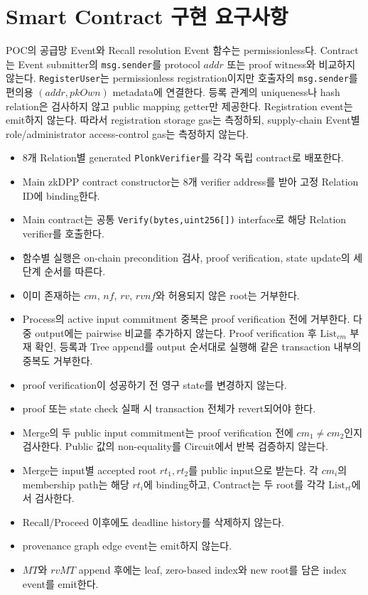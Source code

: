 \documentclass[11pt,a4paper]{extarticle}
\newcommand{\List}[1]{\mathrm{List}_{#1}}
\begin{document}
\section{Smart Contract 구현 요구사항}

POC의 공급망 Event와 Recall resolution Event 함수는 permissionless다. Contract는
Event submitter의 \texttt{msg.sender}를 protocol $addr$ 또는 proof witness와 비교하지
않는다. \texttt{RegisterUser}는 permissionless registration이지만 호출자의
\texttt{msg.sender}를 편의용 $(addr,pkOwn)$ metadata에 연결한다. 등록 관계의
uniqueness나 hash relation은 검사하지 않고 public mapping getter만 제공한다.
Registration event는 emit하지 않는다. 따라서 registration storage gas는
측정하되, supply-chain Event별 role/administrator access-control gas는 측정하지 않는다.

\begin{itemize}
  \item 8개 Relation별 generated \texttt{PlonkVerifier}를 각각 독립 contract로 배포한다.
  \item Main zkDPP contract constructor는 8개 verifier address를 받아 고정 Relation ID에 binding한다.
  \item Main contract는 공통 \texttt{Verify(bytes,uint256[])} interface로 해당 Relation verifier를 호출한다.
  \item 함수별 실행은 on-chain precondition 검사, proof verification, state update의
        세 단계 순서를 따른다.
  \item 이미 존재하는 $cm$, $nf$, $rv$, $rvnf$와 허용되지 않은 root는 거부한다.
  \item Process의 active input commitment 중복은 proof verification 전에 거부한다.
        다중 output에는 pairwise 비교를 추가하지 않는다. Proof verification 후
        $\List{cm}$ 부재 확인, 등록과 Tree append를 output 순서대로 실행해 같은
        transaction 내부의 중복도 거부한다.
  \item proof verification이 성공하기 전 영구 state를 변경하지 않는다.
  \item proof 또는 state check 실패 시 transaction 전체가 revert되어야 한다.
  \item Merge의 두 public input commitment는 proof verification 전에
        $cm_1\neq cm_2$인지 검사한다. Public 값의 non-equality를 Circuit에서 반복 검증하지 않는다.
  \item Merge는 input별 accepted root $rt_1,rt_2$를 public input으로 받는다.
        각 $cm_i$의 membership path는 해당 $rt_i$에 binding하고, Contract는 두 root를
        각각 $\List{rt}$에서 검사한다.
  \item Recall/Proceed 이후에도 deadline history를 삭제하지 않는다.
  \item provenance graph edge event는 emit하지 않는다.
  \item $MT$와 $rvMT$ append 후에는 leaf, zero-based index와 new root를 담은
        index event를 emit한다.
\end{itemize}
\end{document}
